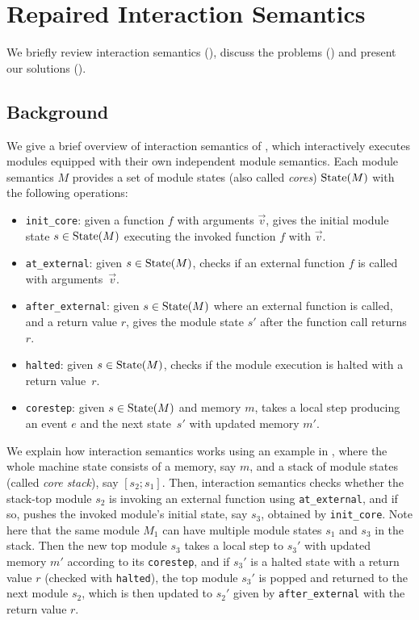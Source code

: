 \chapter{\;\;\;\;Repaired Interaction Semantics}
\label{sec:overview-semantics}

We briefly review interaction semantics (), discuss the problems () and present our solutions ().

\section{Background}
\label{sec:overview-semantics:background}

We give a brief overview of interaction semantics of \ccc{}, which
interactively executes modules equipped with their own independent
module semantics. Each module semantics $M$ provides
a set of module states (also called \emph{cores}) $\textrm{State}(M)$ with the following operations:
\begin{itemize}
\item \texttt{init\_core}: given a function $f$ with arguments $\vec{v}$,
  gives the initial module state $s \in \textrm{State}(M)$
  executing the invoked function $f$ with $\vec{v}$.
\item \texttt{at\_external}: given $s \in \textrm{State}(M)$,
  checks if an external function $f$ is called with arguments~$\vec{v}$.
\item \texttt{after\_external}: given $s \in \textrm{State}(M)$
  where an external function is called,
  and a return value $r$,
  gives the module state $s'$
  after the function call returns $r$.
\item \texttt{halted}: given $s \in \textrm{State}(M)$, checks if the module execution is halted with a return value~$r$.
\item \texttt{corestep}: given $s \in \textrm{State}(M)$ and memory $m$, takes a local step producing an event $e$ and the next state~$s'$ with updated memory $m'$.
\end{itemize}

We explain how interaction semantics works using an example in
, where the whole machine state consists of a
memory, say $m$, and a stack of module states (called \emph{core stack}), say $[s_2; s_1]$.
Then, interaction semantics checks whether the stack-top module $s_2$
is invoking an external function using \texttt{at\_external}, and if
so, pushes the invoked module's initial state, say $s_3$, obtained by
\texttt{init\_core}. Note here that the same module $M_1$ can have
multiple module states $s_1$ and $s_3$ in the stack.  Then the
new top module $s_3$ takes a local step to $s_3'$ with updated memory
$m'$ according to its \texttt{corestep}, and if $s_3'$ is a halted
state with a return value $r$ (checked with \texttt{halted}), the top
module $s_3'$ is popped and returned to the next module $s_2$, which
is then updated to $s_2'$ given by \texttt{after\_external} with the return
value $r$.

